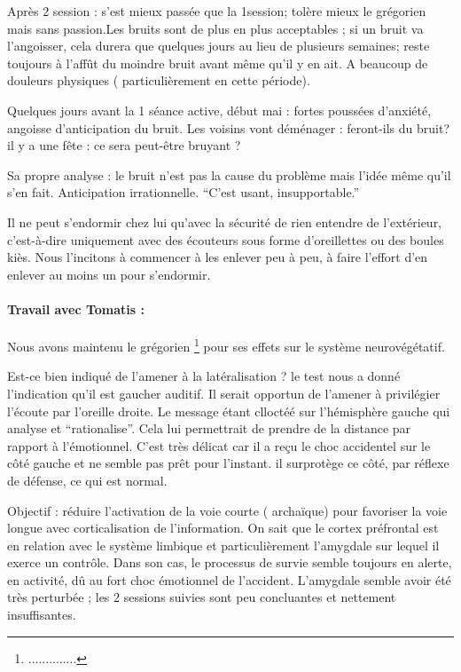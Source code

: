 Après 2 \textdegree{} session : s'est mieux passée que la 1\textdegree session;
tolère mieux le grégorien mais sans passion.Les bruits sont de plus
en plus acceptables ; si un bruit va l'angoisser, cela durera que
quelques jours au lieu de plusieurs semaines; reste toujours à l'affût
du moindre bruit avant même qu'il y en ait. A beaucoup de douleurs
physiques ( particulièrement en cette période).

Quelques jours avant la 1\textdegree{} séance active, début mai :
fortes poussées d'anxiété, angoisse d'anticipation du bruit. Les voisins
vont déménager : feront-ils du bruit? il y a une fête : ce sera peut-être
bruyant ?

Sa propre analyse : le bruit n'est pas la cause du problème mais l'idée
même qu'il s'en fait. Anticipation irrationnelle. ``C'est usant,
insupportable.''

Il ne peut s'endormir chez lui qu'avec la sécurité de rien entendre
de l'extérieur, c'est-à-dire uniquement avec des écouteurs sous forme
d'oreillettes ou des boules kiès. Nous l'incitons à commencer à les
enlever peu à peu, à faire l'effort d'en enlever au moins un pour
s'endormir. 

\paragraph{Travail avec Tomatis :}

Nous avons maintenu le grégorien \footnote{..............} pour ses
effets sur le système neurovégétatif.

Est-ce bien indiqué de l'amener à la latéralisation ? le test nous
a donné l'indication qu'il est gaucher auditif. Il serait opportun
de l'amener à privilégier l'écoute par l'oreille droite. Le message
étant clloctéé sur l'hémisphère gauche qui analyse et ``rationalise''.
Cela lui permettrait de prendre de la distance par rapport à l'émotionnel.
C'est très délicat car il a reçu le choc accidentel sur le côté gauche
et ne semble pas prêt pour l'instant. il surprotège ce côté, par réflexe
de défense, ce qui est normal. 

Objectif : réduire l'activation de la voie courte ( archaïque) pour
favoriser la voie longue avec corticalisation de l'information. On
sait que le cortex préfrontal est en relation avec le système limbique
et particulièrement l'amygdale sur lequel il exerce un contrôle. Dans
son cas, le processus de survie semble toujours en alerte, en activité,
dû au fort choc émotionnel de l'accident. L'amygdale semble avoir
été très perturbée ; les 2 sessions suivies sont peu concluantes et
nettement insuffisantes.

